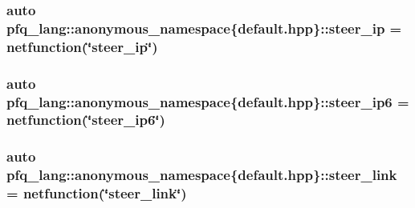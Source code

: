 \hypertarget{namespacepfq__lang_1_1anonymous__namespace_02default_8hpp_03_ab44cbea49db522460c5bce82d04280cd}{
\subsubsection[{steer\+\_\+ip}]{\setlength{\rightskip}{0pt plus 5cm}auto pfq\+\_\+lang\+::anonymous\+\_\+namespace\{default.\+hpp\}\+::steer\+\_\+ip = {\bf netfunction}(\char`\"{}steer\+\_\+ip\char`\"{})}}\label{namespacepfq__lang_1_1anonymous__namespace_02default_8hpp_03_ab44cbea49db522460c5bce82d04280cd}
\hypertarget{namespacepfq__lang_1_1anonymous__namespace_02default_8hpp_03_a011de504f63578469615a302f823d238}{
\subsubsection[{steer\+\_\+ip6}]{\setlength{\rightskip}{0pt plus 5cm}auto pfq\+\_\+lang\+::anonymous\+\_\+namespace\{default.\+hpp\}\+::steer\+\_\+ip6 = {\bf netfunction}(\char`\"{}steer\+\_\+ip6\char`\"{})}}\label{namespacepfq__lang_1_1anonymous__namespace_02default_8hpp_03_a011de504f63578469615a302f823d238}
\hypertarget{namespacepfq__lang_1_1anonymous__namespace_02default_8hpp_03_af339132b49ec24313a1b3d33cefb1628}{
\subsubsection[{steer\+\_\+link}]{\setlength{\rightskip}{0pt plus 5cm}auto pfq\+\_\+lang\+::anonymous\+\_\+namespace\{default.\+hpp\}\+::steer\+\_\+link = {\bf netfunction}(\char`\"{}steer\+\_\+link\char`\"{})}}\label{namespacepfq__lang_1_1anonymous__namespace_02default_8hpp_03_af339132b49ec24313a1b3d33cefb1628}
